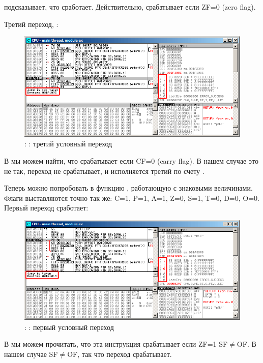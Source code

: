 \olly подсказывает, что \JNZ сработает.
Действительно, \JNZ срабатывает если ZF=0 (zero flag).

\clearpage
Третий переход, \JNB:

\begin{figure}[H]
\centering
\includegraphics[scale=\FigScale]{patterns/07_jcc/simple/olly_unsigned3.png}
\caption{\olly: : третий условный переход}
\label{fig:jcc_olly_unsigned_3}
\end{figure}

В \cite{Intel} мы можем найти, что \JNB срабатывает если CF=0 (carry flag).
В нашем случае это не так, переход не срабатывает, и исполняется третий по счету \printf.

\clearpage
Теперь можно попробовать в \olly функцию , работающую с знаковыми величинами.
Флаги выставляются точно так же: C=1, P=1, A=1, Z=0, S=1, T=0, D=0, O=0.
Первый переход \JLE сработает:

\begin{figure}[H]
\centering
\includegraphics[scale=\FigScale]{patterns/07_jcc/simple/olly_signed1.png}
\caption{\olly: : первый условный переход}
\label{fig:jcc_olly_signed_1}
\end{figure}

В \cite{Intel} мы можем прочитать, что эта инструкция срабатывает если ZF=1 \OrENRU SF$\neq$OF.
В нашем случае SF$\neq$OF, так что переход срабатывает.


